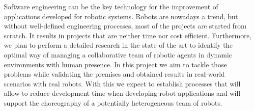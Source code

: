 Software engineering can be the key technology for the improvement of applications developed for robotic systems.
Robots are nowadays a trend, but without well-defined engineering processes, most of the projects are started from scratch.
It results in projects that are neither time nor cost efficient.
Furthermore, we plan to perform a detailed research in the state of the art to identify the optimal way of managing a collaborative team of robotic agents in dynamic environments with human presence.
In this project we aim to tackle those problems while validating the premises and obtained results in real-world scenarios with real robots.
With this we expect to establish processes that will allow to reduce development time when developing robot applications and will support the choreography of a potentially heterogeneous team of robots.


